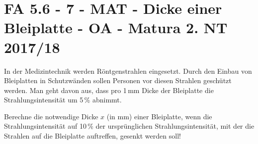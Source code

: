 \section{FA 5.6 - 7 - MAT - Dicke einer Bleiplatte - OA - Matura 2. NT 2017/18}

\begin{beispiel}[FA 5.6]{1}
In der Medizintechnik werden Röntgenstrahlen eingesetzt. Durch den Einbau von Bleiplatten in Schutzwänden sollen Personen vor diesen Strahlen geschützt werden. Man geht davon aus,
dass pro 1\,mm Dicke der Bleiplatte die Strahlungsintensität um 5\,\% abnimmt.\leer

Berechne die notwendige Dicke $x$ (in mm) einer Bleiplatte, wenn die Strahlungsintensität auf 10\,\% der ursprünglichen Strahlungsintensität, mit der die Strahlen auf die Bleiplatte auftreffen, gesenkt werden soll!

\end{beispiel}
